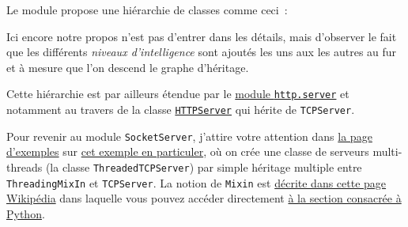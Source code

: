 Le module propose une hiérarchie de classes comme ceci~:

    \begin{Shaded}
\begin{Highlighting}[frame=lines,framerule=0.6mm,rulecolor=\color{asisframecolor}]
    \OperatorTok{+------------+}
    \OperatorTok{|}\OperatorTok{|}
    \OperatorTok{+------------+}
          \OperatorTok{|}
    \OperatorTok{+-----------+}        \OperatorTok{+------------------+}
    \OperatorTok{|}\OperatorTok{|------->|}\OperatorTok{|}
    \OperatorTok{+-----------+}        \OperatorTok{+------------------+}
          \OperatorTok{|}
    \OperatorTok{+-----------+}        \OperatorTok{+--------------------+}
    \OperatorTok{|}\OperatorTok{|------->|}\OperatorTok{|}
    \OperatorTok{+-----------+}        \OperatorTok{+--------------------+}
\end{Highlighting}
\end{Shaded}

    Ici encore notre propos n'est pas d'entrer dans les détails, mais
d'observer le fait que les différents \emph{niveaux d'intelligence} sont
ajoutés les uns aux les autres au fur et à mesure que l'on descend le
graphe d'héritage.

Cette hiérarchie est par ailleurs étendue par le
\href{https://docs.python.org/3/library/http.server.html}{module
\texttt{http.server}} et notamment au travers de la classe
\href{https://docs.python.org/3/library/http.server.html\#http.server.HTTPServer}{\texttt{HTTPServer}}
qui hérite de \texttt{TCPServer}.

    Pour revenir au module \texttt{SocketServer}, j'attire votre attention
dans
\href{https://docs.python.org/3/library/socketserver.html\#examples}{la
page d'exemples} sur
\href{https://docs.python.org/3/library/socketserver.html\#asynchronous-mixins}{cet
exemple en particuler}, où on crée une classe de serveurs multi-threads
(la classe \texttt{ThreadedTCPServer}) par simple héritage multiple
entre \texttt{ThreadingMixIn} et \texttt{TCPServer}. La notion de
\texttt{Mixin} est \href{http://en.wikipedia.org/wiki/Mixin}{décrite
dans cette page Wikipédia} dans laquelle vous pouvez accéder directement
\href{http://en.wikipedia.org/wiki/Mixin\#In_Python}{à la section
consacrée à Python}.


    
    
    

